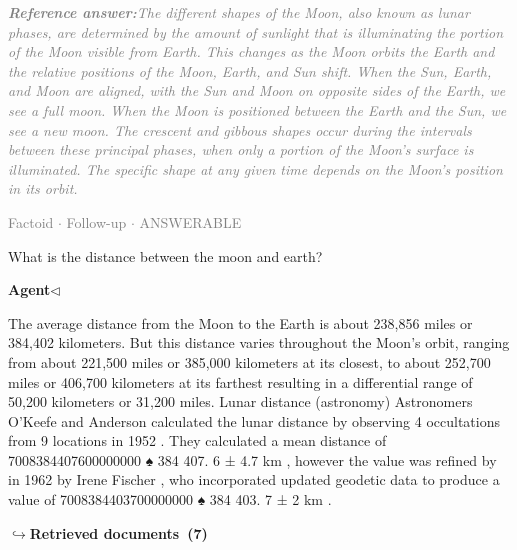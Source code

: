 \documentclass[a4paper,11pt]{article}
\begin{document}
\begin{refanswerenv}
{\footnotesize\textit{\textcolor{gray}{\textbf{Reference answer:}\enspace The different shapes of the Moon, also known as lunar phases, are determined by the amount of sunlight that is illuminating the portion of the Moon visible from Earth. This changes as the Moon orbits the Earth and the relative positions of the Moon, Earth, and Sun shift. When the Sun, Earth, and Moon are aligned, with the Sun and Moon on opposite sides of the Earth, we see a full moon. When the Moon is positioned between the Earth and the Sun, we see a new moon. The crescent and gibbous shapes occur during the intervals between these principal phases, when only a portion of the Moon's surface is illuminated. The specific shape at any given time depends on the Moon's position in its orbit.}}}
\end{refanswerenv}
\vspace{0.5em}
\hfill{\tiny\textcolor{gray}{Factoid $\cdot$ Follow-up $\cdot$ ANSWERABLE}}
\begin{userbubble}
What is the distance between the moon and earth?
\end{userbubble}
\noindent\hfill{\small\textcolor{agentcolor}{\textbf{Agent\enspace$\triangleleft$}}}
\begin{agentbubble}
The average distance from the Moon to the Earth is about 238,856 miles or 384,402 kilometers. But this distance varies throughout the Moon's orbit, ranging from about 221,500 miles or 385,000 kilometers at its closest, to about 252,700 miles or 406,700 kilometers at its farthest resulting in a differential range of 50,200 kilometers or 31,200 miles. Lunar distance (astronomy) Astronomers O'Keefe and Anderson calculated the lunar distance by observing 4 occultations from 9 locations in 1952 . They calculated a mean distance of 7008384407600000000 ♠ 384 407. 6 ± 4.7 km , however the value was refined by in 1962 by Irene Fischer , who incorporated updated geodetic data to produce a value of 7008384403700000000 ♠ 384 403. 7 ± 2 km .
\end{agentbubble}
\noindent\hfill{\footnotesize\textcolor{doccolor}{\textbf{$\hookrightarrow$\enspace Retrieved documents~(7)}}}
\end{document}
